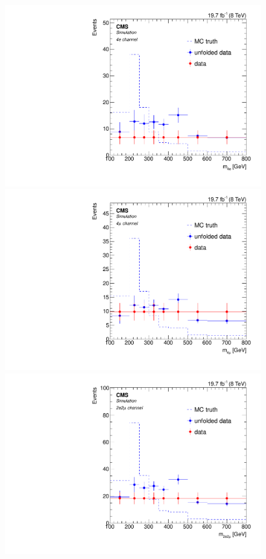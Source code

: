 \begin{figure}[hbtp]
\begin{center}
   \includegraphics[width=0.8\cmsFigWidth]{Figures/Unfolding/MCTests/Biased_Distributions/Mass_ZZTo4e_Pow_fr_SVD_4}     
   \includegraphics[width=0.8\cmsFigWidth]{Figures/Unfolding/MCTests/Biased_Distributions/Mass_ZZTo4m_Pow_fr_SVD_4}     
   \includegraphics[width=0.8\cmsFigWidth]{Figures/Unfolding/MCTests/Biased_Distributions/Mass_ZZTo2e2m_Pow_fr_SVD_4}

\end{center}
\end{figure}
